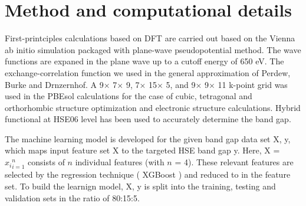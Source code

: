 \documentclass[twocolumn,
superscriptaddress,
 amsmath,amssymb,
 aps, citeautoscript,
prb,
]{revtex4-1}
\begin{document}





\section{Method and computational details}

First-printciples calculations based on DFT are carried out based on the Vienna ab initio simulation packaged with plane-wave pseudopotential method\cite{}. The wave functions are expaned in the plane wave up to a cutoff energy of 650 eV. The exchange-correlation function we used in the general approximation of Perdew, Burke and Drnzernhof. A 9$\times$ 7$\times$ 9, 7$\times$ 15$\times$ 5, and 9$\times$ 9$\times$ 11 k-point grid was used in the PBEsol calculations for the case of cubic, tetragonal and orthorhombic structure optimization and electronic structure calculations. Hybrid functional at HSE06 level has been used
to accurately determine the band gap. 
 
The machine learning model is developed for the given band gap data set {X, y}, which maps input feature set X to the targeted HSE band gap y. Here, X = ${x_{i}}_{i = 1} ^{n}$ consists of $n$ individual features (with $n$ = 4). These relevant features are selected by the regression technique ( XGBoost ) and reduced to in the feature set. To build the learnign model, {X, y} is split into the training, testing and validation sets in the ratio of 80:15:5. 
\end{document}
